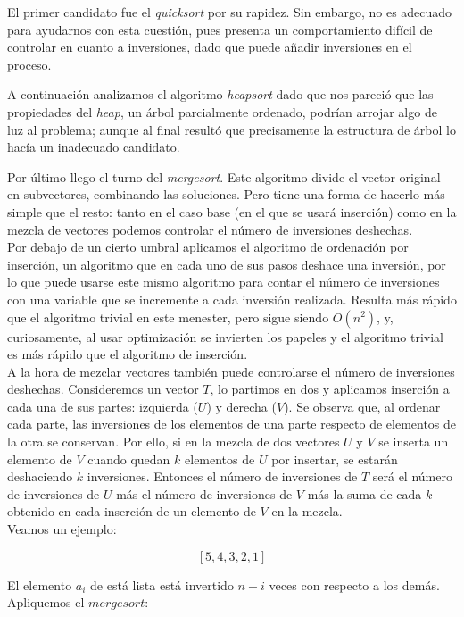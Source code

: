 El primer candidato fue el \textit{quicksort} por su rapidez. Sin embargo, no es adecuado para ayudarnos con esta cuestión, pues presenta un comportamiento difícil de controlar en cuanto a inversiones, dado que puede añadir inversiones en el proceso.

A continuación analizamos el algoritmo \textit{heapsort} dado que nos pareció que las propiedades del \textit{heap}, un árbol parcialmente ordenado, podrían arrojar algo de luz al problema; aunque al final resultó que precisamente la estructura de árbol lo hacía un inadecuado candidato.

Por último llego el turno del \textit{mergesort}. Este algoritmo divide el vector original en subvectores, combinando las soluciones. Pero tiene una forma de hacerlo más simple que el resto: tanto en el caso base (en el que se usará inserción) como en la mezcla de vectores podemos controlar el número de inversiones deshechas. \\

Por debajo de un cierto umbral aplicamos el algoritmo de ordenación por inserción, un algoritmo que en cada uno de sus pasos deshace una inversión, por lo que puede usarse este mismo algoritmo para contar el número de inversiones con una variable que se incremente a cada inversión realizada. Resulta más rápido que el algoritmo trivial en este menester, pero sigue siendo $O(n^2)$, y, curiosamente, al usar optimización se invierten los papeles y el algoritmo trivial es más rápido que el algoritmo de inserción. \\

A la hora de mezclar vectores también puede controlarse el número de inversiones deshechas. Consideremos un vector $T$, lo partimos en dos y aplicamos inserción a cada una de sus partes: izquierda ($U$) y derecha ($V$). Se observa que, al ordenar cada parte, las inversiones de los elementos de una parte respecto de elementos de la otra se conservan. Por ello, si en la mezcla de dos vectores $U$ y $V$ se inserta un elemento de $V$ cuando quedan $k$ elementos de $U$ por insertar, se estarán deshaciendo $k$ inversiones. Entonces el número de inversiones de $T$ será el número de inversiones de $U$ más el número de inversiones de $V$ más la suma de cada $k$ obtenido en cada inserción de un elemento de $V$ en la mezcla.\\

Veamos un ejemplo:

\[[5,4,3,2,1]\]

El elemento $a_i$ de está lista está invertido $n-i$ veces con respecto a los demás. Apliquemos el $mergesort$:


